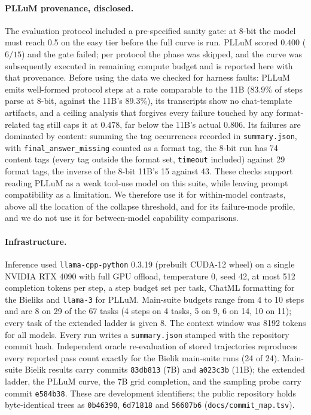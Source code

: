 \documentclass[11pt]{article}
\begin{document}
\paragraph{PLLuM provenance, disclosed.} The evaluation protocol included a pre-specified sanity gate: at 8-bit the model must reach 0.5 on the easy tier before the full curve is run. PLLuM scored $0.400$ ($6/15$) and the gate failed; per protocol the phase was skipped, and the curve was subsequently executed in remaining compute budget and is reported here with that provenance. Before using the data we checked for harness faults: PLLuM emits well-formed protocol steps at a rate comparable to the 11B (83.9\% of steps parse at 8-bit, against the 11B's 89.3\%), its transcripts show no chat-template artifacts, and a ceiling analysis that forgives every failure touched by any format-related tag still caps it at $0.478$, far below the 11B's actual $0.806$. Its failures are dominated by content: summing the tag occurrences recorded in \texttt{summary.json}, with \texttt{final\_answer\_missing} counted as a format tag, the 8-bit run has 74 content tags (every tag outside the format set, \texttt{timeout} included) against 29 format tags, the inverse of the 8-bit 11B's 15 against 43. These checks support reading PLLuM as a weak tool-use model on this suite, while leaving prompt compatibility as a limitation. We therefore use it for within-model contrasts, above all the location of the collapse threshold, and for its failure-mode profile, and we do not use it for between-model capability comparisons.

\paragraph{Infrastructure.} Inference used \texttt{llama-cpp-python} 0.3.19 (prebuilt CUDA-12 wheel) on a single NVIDIA RTX 4090 with full GPU offload, temperature 0, seed 42, at most 512 completion tokens per step, a step budget set per task, ChatML formatting for the Bieliks and \texttt{llama-3} for PLLuM. Main-suite budgets range from 4 to 10 steps and are 8 on 29 of the 67 tasks (4 steps on 4 tasks, 5 on 9, 6 on 14, 10 on 11); every task of the extended ladder is given 8. The context window was 8192 tokens for all models. Every run writes a \texttt{summary.json} stamped with the repository commit hash. Independent oracle re-evaluation of stored trajectories reproduces every reported pass count exactly for the Bielik main-suite runs (24 of 24). Main-suite Bielik results carry commits \texttt{83db813} (7B) and \texttt{a023c3b} (11B); the extended ladder, the PLLuM curve, the 7B grid completion, and the sampling probe carry commit \texttt{e584b38}. These are development identifiers; the public repository holds byte-identical trees as \texttt{0b46390}, \texttt{6d71818} and \texttt{56607b6} (\texttt{docs/commit\_map.tsv}).
\end{document}
